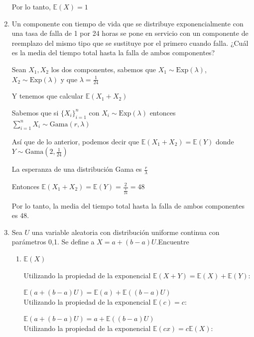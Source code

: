 \documentclass[11pt,a4paper]{report}
\begin{document}
\begin{enumerate}
{			Por lo tanto, $ \mathbb{E}(X) = 1$\\
		}

		\item{
			Un componente con tiempo de vida que se distribuye exponencialmente
			con una tasa de falla de 1 por 24 horas se pone en servicio con un
			componente de reemplazo del mismo tipo que se sustituye por el
			primero cuando falla. ¿Cuál es la media del tiempo total hasta la
			falla de ambos componentes?

			Sean $X_{1}, X_{2}$ los dos componentes, sabemos que $X_{1} \sim \text{Exp}(\lambda)$, $X_{2} \sim \text{Exp}(\lambda)$  y que $\lambda = \frac{1}{24}$

			Y tenemos que calcular $\mathbb{E}(X_{1} + X_{2})$

			Sabemos que si $\{X_i\}_{i=1}^{n}$ con $X_{i} \sim \text{Exp}(\lambda)$ entonces $\sum_{i=1}^{n}  X_{i} \sim \text{Gama}(r, \lambda) $

			Así que de lo anterior, podemos decir que  $\mathbb{E}(X_{1} + X_{2}) = \mathbb{E}(Y)$ donde $Y \sim \text{Gama}(2, \frac{1}{24})$

			La esperanza de una distribución Gama es $\frac{r}{\lambda}$

			Entonces $\mathbb{E}(X_{1} + X_{2}) = \mathbb{E}(Y) = \frac{2}{\frac{1}{24}} = 48$

			Por lo tanto, la media del tiempo total hasta la
			falla de ambos componentes es 48.\\
		}

		\item{
			Sea $U$ una variable aleatoria con distribución uniforme continua
			con parámetros 0,1. Se define a $X = a+(b - a)U$.Encuentre
			\begin{enumerate}
				\item {
					$\mathbb{E}(X)$

					Utilizando la propiedad de la exponencial $\mathbb{E}(X + Y) = \mathbb{E}(X) + \mathbb{E}(Y)$:

					$\mathbb{E}(a+(b - a)U) = \mathbb{E}(a) + \mathbb{E}((b - a)U)$\\

					Utilizando la propiedad de la exponencial $\mathbb{E}(c) = c$:

					$\mathbb{E}(a+(b - a)U) = a + \mathbb{E}((b - a)U)$\\

					Utilizando la propiedad de la exponencial $\mathbb{E}(cx) = c\mathbb{E}(X)$:

}
\end{enumerate}}
\end{enumerate}
\end{document}
